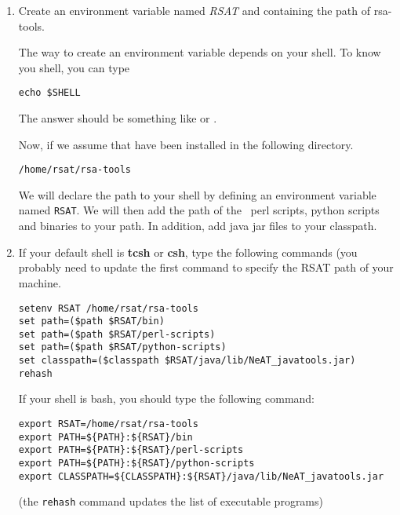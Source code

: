 \begin{enumerate}

\item Create an environment variable named \textit{RSAT} and
  containing the path of rsa-tools.

  The way to create an environment variable depends on your shell. To
  know you shell, you can type

\begin{footnotesize}
\begin{verbatim}
echo $SHELL
\end{verbatim}
\end{footnotesize}

The answer should be something like  or
.

Now, if we assume that \RSAT have been installed in the following
directory.

\begin{footnotesize}
\begin{verbatim}
/home/rsat/rsa-tools
\end{verbatim}
\end{footnotesize}


We will declare the \RSAT path to your shell by defining an
environment variable named \texttt{RSAT}.  We will then add the path
of the \RSAT \ perl scripts, python scripts and binaries to your
path. In addition, add java jar files to your classpath.

\item If your default shell is \textbf{tcsh} or \textbf{csh}, type the
  following commands (you probably need to update the first command to
  specify the RSAT path of your machine.

\begin{footnotesize}
\begin{verbatim}
setenv RSAT /home/rsat/rsa-tools
set path=($path $RSAT/bin)
set path=($path $RSAT/perl-scripts)
set path=($path $RSAT/python-scripts)
set classpath=($classpath $RSAT/java/lib/NeAT_javatools.jar)
rehash
\end{verbatim}
\end{footnotesize}



If your shell is bash, you should type the following command:

\begin{footnotesize}
\begin{verbatim}
export RSAT=/home/rsat/rsa-tools
export PATH=${PATH}:${RSAT}/bin
export PATH=${PATH}:${RSAT}/perl-scripts
export PATH=${PATH}:${RSAT}/python-scripts
export CLASSPATH=${CLASSPATH}:${RSAT}/java/lib/NeAT_javatools.jar
\end{verbatim}
\end{footnotesize}



(the \texttt{rehash} command updates the list of executable programs)

\end{enumerate}


